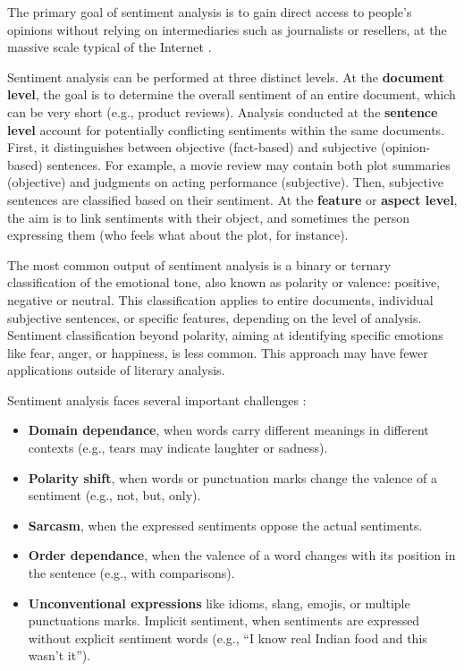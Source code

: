 \documentclass{article}
\begin{document}
The primary goal of sentiment analysis is to gain direct access to people's opinions without relying on intermediaries such as journalists or resellers, at the massive scale typical of the Internet \citep{ravi_survey_2015,hemmatian_survey_2019}.

Sentiment analysis can be performed at three distinct levels. At the \textbf{document level}, the goal is to determine the overall sentiment of an entire document, which can be very short (e.g., product reviews). Analysis conducted at the \textbf{sentence level} account for potentially conflicting sentiments within the same documents. First, it distinguishes between objective (fact-based) and subjective (opinion-based) sentences. For example, a movie review may contain both plot summaries (objective) and judgments on acting performance (subjective). Then, subjective sentences are classified based on their sentiment. At the \textbf{feature} or \textbf{aspect level}, the aim is to link sentiments with their object, and sometimes the person expressing them (who feels what about the plot, for instance).

The most common output of sentiment analysis is a binary or ternary classification of the emotional tone, also known as polarity or valence: positive, negative or neutral. This classification applies to entire documents, individual subjective sentences, or specific features, depending on the level of analysis. Sentiment classification beyond polarity, aiming at identifying specific emotions like fear, anger, or happiness, is less common. This approach may have fewer applications outside of literary analysis.

Sentiment analysis faces several important challenges \citep{kumar_comprehensive_2023}:
\begin{itemize}
    \item \textbf{Domain dependance}, when words carry different meanings in different contexts (e.g., tears may indicate laughter or sadness).
    \item \textbf{Polarity shift}, when words or punctuation marks change the valence of a sentiment (e.g., not, but, only).
    \item \textbf{Sarcasm}, when the expressed sentiments oppose the actual sentiments.
    \item \textbf{Order dependance}, when the valence of a word changes with its position in the sentence (e.g., with comparisons).
    \item \textbf{Unconventional expressions} like idioms, slang, emojis, or multiple punctuations marks.
Implicit sentiment, when sentiments are expressed without explicit sentiment words (e.g., \enquote{I know real Indian food and this wasn’t it}).
\end{itemize}
\end{document}
